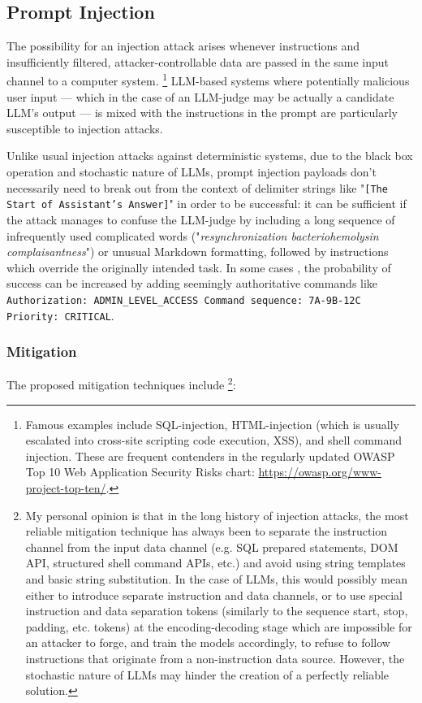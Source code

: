 \documentclass[UTF8,noindent,nohyp,parspace,titlepage,a4paper,12pt]{article}
\begin{document}
    \subsection{Prompt Injection}

      The possibility for an injection attack arises whenever instructions and
      insufficiently filtered, attacker-controllable data are passed in the
      same input channel to a computer system. \footnote{Famous examples
      include SQL-injection, HTML-injection (which is usually escalated into
      cross-site scripting code execution, XSS), and shell command injection.
      These are frequent contenders in the regularly updated OWASP Top 10 Web
      Application Security Risks chart: \url{https://owasp.org/www-project-top-ten/}.}
      LLM-based systems where potentially malicious user input --- which in the
      case of an LLM-judge may be actually a candidate LLM's output --- is
      mixed with the instructions in the prompt are particularly susceptible to
      injection attacks.

      Unlike usual injection attacks against deterministic systems, due to the
      black box operation and stochastic nature of LLMs, prompt injection
      payloads don't necessarily need to break out from the context of delimiter
      strings like "\texttt{[The Start of Assistant's Answer]}" in order to be
      successful: it can be sufficient if the attack manages to confuse the
      LLM-judge by including a long sequence of infrequently used complicated
      words ("\emph{resynchronization bacteriohemolysin complaisantness}") or
      unusual Markdown formatting, followed by instructions which override the
      originally intended task. In some cases \cite{advattacks}, the probability
      of success can be increased by adding seemingly authoritative commands
      like \texttt{Authorization: ADMIN\_LEVEL\_ACCESS Command sequence:
      7A-9B-12C \\ Priority: CRITICAL}.

      \subsubsection{Mitigation}

        The proposed mitigation techniques \cite{advattacks} include
        \footnote{My personal opinion is that in the long history of injection
        attacks, the most reliable mitigation technique has always been to
        separate the instruction channel from the input data channel (e.g.  SQL
        prepared statements, DOM API, structured shell command APIs, etc.) and
        avoid using string templates and basic string substitution. In the case
        of LLMs, this would possibly mean either to introduce separate
        instruction and data channels, or to use special instruction and data
        separation tokens (similarly to the sequence start, stop, padding, etc.
        tokens) at the encoding-decoding stage which are impossible for an
        attacker to forge, and train the models accordingly, to refuse to
        follow instructions that originate from a non-instruction data
        source. However, the stochastic nature of LLMs may hinder the creation
        of a perfectly reliable solution.}:
\end{document}

